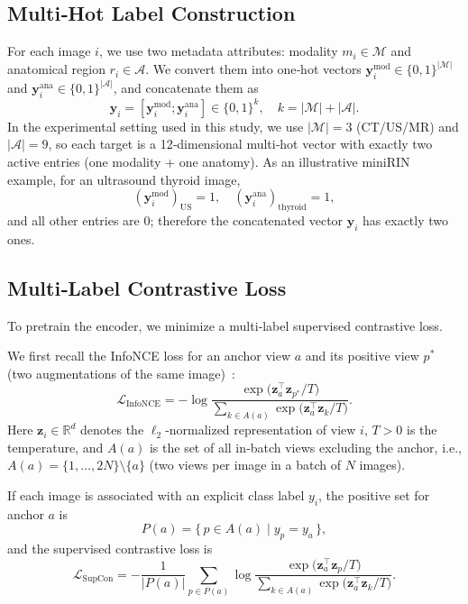 \documentclass[final,1p,times]{elsarticle}
\newcommand{\revadd}[1]{#1}
\begin{document}
\subsection{\revadd{Multi‑Hot Label Construction}}
\revadd{For each image $i$, we use two metadata attributes: modality $m_i \in \mathcal{M}$ and anatomical region $r_i \in \mathcal{A}$.}
\revadd{We convert them into one‑hot vectors $\mathbf y_i^{\mathrm{mod}}\in\{0,1\}^{|\mathcal{M}|}$ and $\mathbf y_i^{\mathrm{ana}}\in\{0,1\}^{|\mathcal{A}|}$, and concatenate them as}
{
\[
\mathbf y_i=[\mathbf y_i^{\mathrm{mod}};\mathbf y_i^{\mathrm{ana}}]\in\{0,1\}^{k},
\quad k=|\mathcal{M}|+|\mathcal{A}|.
\]
}
\revadd{In the experimental setting used in this study, we use $|\mathcal{M}|=3$ (CT/US/MR) and $|\mathcal{A}|=9$, so each target is a 12‑dimensional multi‑hot vector with exactly two active entries (one modality + one anatomy).}
\revadd{As an illustrative miniRIN example, for an ultrasound thyroid image,}
{
\[
(\mathbf y_i^{\mathrm{mod}})_{\mathrm{US}}=1,\quad
(\mathbf y_i^{\mathrm{ana}})_{\mathrm{thyroid}}=1,
\]
}
\revadd{and all other entries are $0$; therefore the concatenated vector $\mathbf y_i$ has exactly two ones.}

\subsection{Multi‑Label Contrastive Loss}
To pretrain the encoder, we minimize a multi‑label supervised contrastive loss.

We first recall the InfoNCE loss for an anchor view $a$ and its positive view $p^\ast$ (two augmentations of the same image)~\cite{oord_representation_2018}:
\begin{equation}
  \mathcal{L}_{\mathrm{InfoNCE}}
  = -\log
    \frac{\exp\!\bigl(\mathbf z_a^{\top}\mathbf z_{p^\ast}/T\bigr)}
         {\displaystyle\sum_{k \in A(a)}
          \exp\!\bigl(\mathbf z_a^{\top}\mathbf z_k / T\bigr)} .
  \label{eq:step1}
\end{equation}
Here $\mathbf z_i \in \mathbb{R}^d$ denotes the $\ell_2$‑normalized representation of view $i$, $T>0$ is the temperature, and $A(a)$ is the set of all in‑batch views excluding the anchor, i.e., $A(a)=\{1,\ldots,2N\}\setminus\{a\}$ (two views per image in a batch of $N$ images).

If each image is associated with an explicit class label $y_i$,
the positive set for anchor $a$ is
\[
  P(a)=\{\,p \in A(a)\mid y_p=y_a\,\},
\]
and the supervised contrastive loss is~\cite{khosla2020supervised}
\begin{equation}
  \mathcal{L}_{\mathrm{SupCon}}
  = -\frac{1}{|P(a)|}
    \sum_{p\in P(a)}
    \log\frac{\exp\!\bigl(\mathbf z_a^{\top}\mathbf z_p/T\bigr)}
              {\displaystyle\sum_{k \in A(a)}
               \exp\!\bigl(\mathbf z_a^{\top}\mathbf z_k/T\bigr)} .
  \label{eq:step2}
\end{equation}
\end{document}
